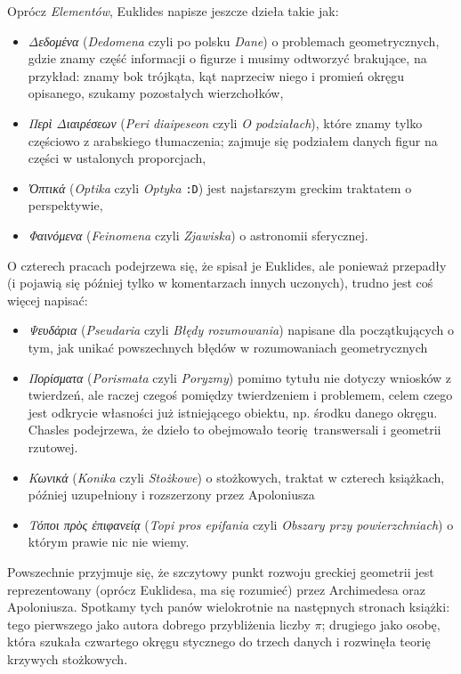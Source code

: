 Oprócz \emph{Elementów}, Euklides napisze jeszcze dzieła takie jak:
\begin{itemize}
    \item \emph{Δεδομένα} (\emph{Dedomena} czyli po polsku \emph{Dane}) o problemach geometrycznych, gdzie znamy część informacji o figurze i musimy odtworzyć brakujące, na przykład: znamy bok trójkąta, kąt naprzeciw niego i promień okręgu opisanego, szukamy pozostałych wierzchołków,
    \item \emph{Περὶ Διαιρέσεων} (\emph{Peri diaipeseon} czyli \emph{O podziałach}), które znamy tylko częściowo z arabskiego tłumaczenia; zajmuje się podziałem danych figur na części w ustalonych proporcjach,
    \item \emph{Ὀπτικά} (\emph{Optika} czyli \emph{Optyka} \texttt{:D}) jest najstarszym greckim traktatem o perspektywie,
    \item \emph{Φαινόμενα} (\emph{Feinomena} czyli \emph{Zjawiska}) o astronomii sferycznej.
\end{itemize}

O czterech pracach podejrzewa się, że spisał je Euklides, ale ponieważ przepadły (i pojawią się później tylko w komentarzach innych uczonych), trudno jest coś więcej napisać:
\begin{itemize}
\item \emph{Ψευδάρια} (\emph{Pseudaria} czyli \emph{Błędy rozumowania}) napisane dla początkujących o tym, jak unikać powszechnych błędów w rozumowaniach geometrycznych
\item \emph{Πορίσματα} (\emph{Porismata} czyli \emph{Poryzmy}) pomimo tytułu nie dotyczy wniosków z twierdzeń, ale raczej czegoś pomiędzy twierdzeniem i problemem, celem czego jest odkrycie własności już istniejącego obiektu, np. środku danego okręgu.
Chasles podejrzewa, że dzieło to obejmowało teorię transwersali i geometrii rzutowej.
%
\item \emph{Κωνικά} (\emph{Konika} czyli \emph{Stożkowe}) o stożkowych, traktat w czterech książkach, później uzupełniony i rozszerzony przez Apoloniusza
\item \emph{Τόποι πρὸς ἐπιφανείᾳ} (\emph{Topi pros epifania} czyli \emph{Obszary przy powierzchniach}) o którym prawie nic nie wiemy.
\end{itemize}

Powszechnie przyjmuje się, że szczytowy punkt rozwoju greckiej geometrii jest reprezentowany (oprócz Euklidesa, ma się rozumieć) przez Archimedesa oraz Apoloniusza.
Spotkamy tych panów wielokrotnie na następnych stronach książki: tego pierwszego jako autora dobrego przybliżenia liczby $\pi$;
drugiego jako osobę, która szukała czwartego okręgu stycznego do trzech danych i rozwinęła teorię krzywych stożkowych.

